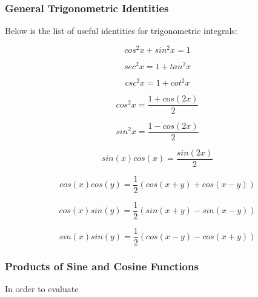 \documentclass[a4paper,12pt]{article}
\begin{document}
\subsubsection{General Trigonometric Identities}
\begin{thm}
  Below is the list of useful identities for trigonometric integrals:

  \begin{alist}
    \item \begin{rlist}
      \item

      $$cos^{2}x+sin^{2}x=1$$

      \item

      $$sec^{2}x=1+tan^{2}x$$

      \item

      $$csc^{2}x=1+cot^{2}x$$
    \end{rlist}
    \item \begin{rlist}
      \item

      $$cos^{2}x=\frac{1+cos(2x)}{2}$$

      \item

      $$sin^{2}x=\frac{1-cos(2x)}{2}$$

      \item

      $$sin(x)cos(x)=\frac{sin(2x)}{2}$$
    \end{rlist}
    \item \begin{rlist}
      \item

      $$cos(x)cos(y)=\frac{1}{2}(cos(x+y)+cos(x-y))$$

      \item

      $$cos(x)sin(y)=\frac{1}{2}(sin(x+y)-sin(x-y))$$

      \item

      $$sin(x)sin(y)=\frac{1}{2}(cos(x-y)-cos(x+y))$$
    \end{rlist}
  \end{alist}
\end{thm}

\subsubsection{Products of Sine and Cosine Functions}
In order to evaluate
\end{document}
